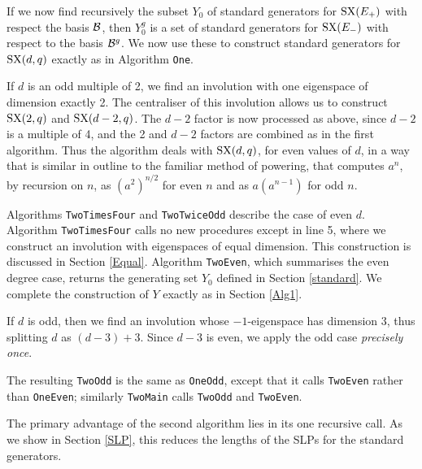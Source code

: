 \documentclass[12pt]{article}
\def\SX{{\rm SX}}
\begin{document}
If we now find recursively the subset $Y_0$ of
standard generators for $\SX(E_+)$ with respect the basis $\cal B$,
then $Y_0^g$ is a set of standard generators for $\SX(E_-)$ with
respect to the basis ${\cal B}^g$. We now use these 
to construct standard generators for 
$\SX(d,q)$ exactly as in Algorithm {\tt One}.

If $d$ is an odd multiple of 2, we find an involution with one
eigenspace of dimension exactly 2. The centraliser of this
involution allows us to construct $\SX(2,q)$ and $\SX(d-2,q)$. The $d-2$
factor is now processed as above, since $d-2$ is a multiple of 4, and
the 2 and $d-2$ factors are combined as in the first algorithm. Thus
the algorithm deals with $\SX(d,q)$, for even  values of $d$, in a way
that is similar in outline to the familiar method of powering, that
computes $a^n$, by recursion on $n$, as $(a^2)^{n/2}$ for even $n$ and
as $a(a^{n-1})$ for odd $n$.

Algorithms {\tt TwoTimesFour} and {\tt TwoTwiceOdd} 
describe the case of even $d$. 
Algorithm {\tt TwoTimesFour} calls no new procedures except in line 5,
where we construct an involution with eigenspaces of equal dimension.
This construction is discussed in Section \ref{Equal}.
Algorithm {\tt TwoEven}, which summarises the even degree case,
returns the generating set $Y_0$ defined in Section \ref{standard}. 
We complete the construction of $Y$ exactly as in Section \ref{Alg1}.

If $d$ is odd, then we find an involution whose $-1$-eigenspace has
dimension 3, thus splitting $d$ as $(d-3)+3$. Since $d-3$ is even, we
apply the odd case {\it precisely once}.

The resulting {\tt TwoOdd} is the same as {\tt OneOdd},
except that it calls {\tt TwoEven} rather than {\tt OneEven};
similarly {\tt TwoMain} calls {\tt TwoOdd} and {\tt TwoEven}.

The primary advantage of the second algorithm 
lies in its one recursive call. 
As we show in Section \ref{SLP}, 
this reduces the lengths of the 
SLPs for the standard generators.
\end{document}
